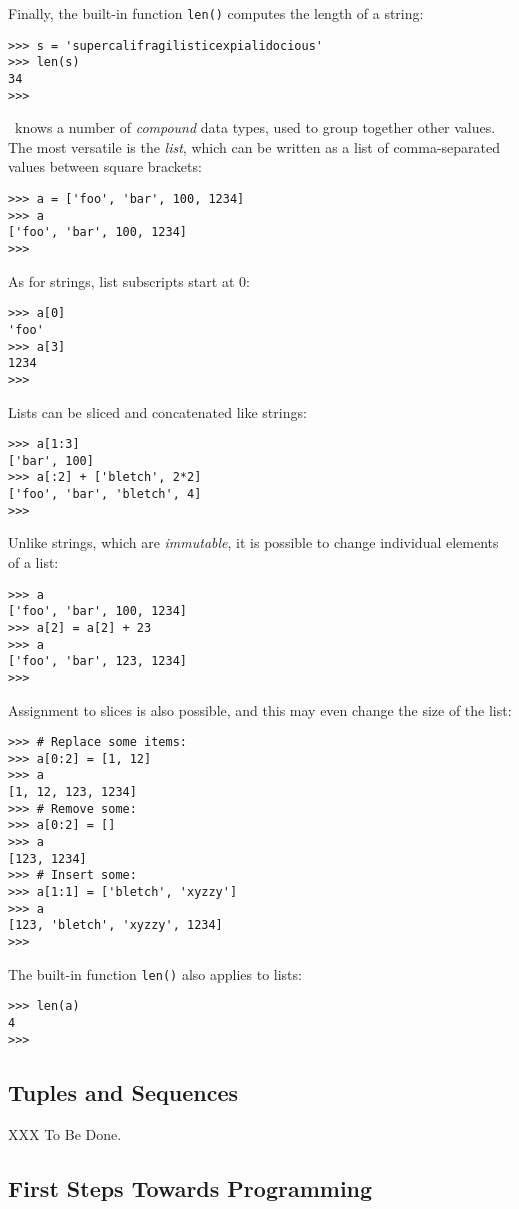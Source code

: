 Finally, the built-in function {\tt len()} computes the length of a
string:
\bcode\begin{verbatim}
>>> s = 'supercalifragilisticexpialidocious'
>>> len(s)
34
>>>
\end{verbatim}\ecode
\Python\ knows a number of
{\em compound}
data types, used to group together other values.
The most versatile is the
{\em list},
which can be written as a list of comma-separated values between square
brackets:
\bcode\begin{verbatim}
>>> a = ['foo', 'bar', 100, 1234]
>>> a
['foo', 'bar', 100, 1234]
>>>
\end{verbatim}\ecode
As for strings, list subscripts start at 0:
\bcode\begin{verbatim}
>>> a[0]
'foo'
>>> a[3]
1234
>>>
\end{verbatim}\ecode
Lists can be sliced and concatenated like strings:
\bcode\begin{verbatim}
>>> a[1:3]
['bar', 100]
>>> a[:2] + ['bletch', 2*2]
['foo', 'bar', 'bletch', 4]
>>>
\end{verbatim}\ecode
Unlike strings, which are
{\em immutable},
it is possible to change individual elements of a list:
\bcode\begin{verbatim}
>>> a
['foo', 'bar', 100, 1234]
>>> a[2] = a[2] + 23
>>> a
['foo', 'bar', 123, 1234]
>>>
\end{verbatim}\ecode
Assignment to slices is also possible, and this may even change the size
of the list:
\bcode\begin{verbatim}
>>> # Replace some items:
>>> a[0:2] = [1, 12]
>>> a
[1, 12, 123, 1234]
>>> # Remove some:
>>> a[0:2] = []
>>> a
[123, 1234]
>>> # Insert some:
>>> a[1:1] = ['bletch', 'xyzzy']
>>> a
[123, 'bletch', 'xyzzy', 1234]
>>>
\end{verbatim}\ecode
The built-in function {\tt len()} also applies to lists:
\bcode\begin{verbatim}
>>> len(a)
4
>>>
\end{verbatim}\ecode

\subsection{Tuples and Sequences}

XXX To Be Done.

\subsection{First Steps Towards Programming}

